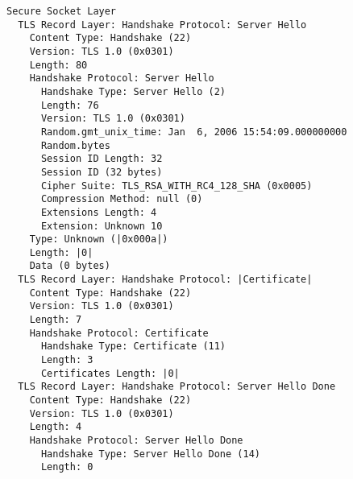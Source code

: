 \begin{lstlisting}[caption={Resposta do servidor com destaque para a mensagem \tlsHsC vazia}]
Secure Socket Layer 
  TLS Record Layer: Handshake Protocol: Server Hello 
    Content Type: Handshake (22) 
    Version: TLS 1.0 (0x0301) 
    Length: 80 
    Handshake Protocol: Server Hello 
      Handshake Type: Server Hello (2) 
      Length: 76 
      Version: TLS 1.0 (0x0301) 
      Random.gmt_unix_time: Jan  6, 2006 15:54:09.000000000 
      Random.bytes 
      Session ID Length: 32 
      Session ID (32 bytes) 
      Cipher Suite: TLS_RSA_WITH_RC4_128_SHA (0x0005) 
      Compression Method: null (0) 
      Extensions Length: 4 
      Extension: Unknown 10 
	Type: Unknown (|0x000a|) 
	Length: |0| 
	Data (0 bytes) 
  TLS Record Layer: Handshake Protocol: |Certificate| 
    Content Type: Handshake (22) 
    Version: TLS 1.0 (0x0301) 
    Length: 7 
    Handshake Protocol: Certificate 
      Handshake Type: Certificate (11) 
      Length: 3 
      Certificates Length: |0| 
  TLS Record Layer: Handshake Protocol: Server Hello Done 
    Content Type: Handshake (22) 
    Version: TLS 1.0 (0x0301) 
    Length: 4 
    Handshake Protocol: Server Hello Done 
      Handshake Type: Server Hello Done (14) 
      Length: 0
\end{lstlisting}


